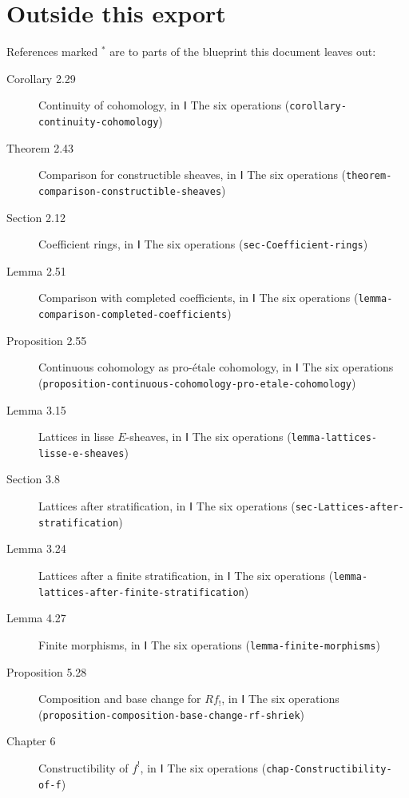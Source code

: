 \documentclass[11pt]{article}
\newcommand{\bpslug}[1]{\texttt{#1}}
\begin{document}
\section*{Outside this export}
References marked \ensuremath{{}^\ast} are to parts of the blueprint this document leaves out:
\begin{description}
\item[Corollary 2.29] Continuity of cohomology, in Ⅰ The six operations (\bpslug{corollary-{}\allowbreak{}continuity-{}\allowbreak{}cohomology})
\item[Theorem 2.43] Comparison for constructible sheaves, in Ⅰ The six operations (\bpslug{theorem-{}\allowbreak{}comparison-{}\allowbreak{}constructible-{}\allowbreak{}sheaves})
\item[Section 2.12] Coefficient rings, in Ⅰ The six operations (\bpslug{sec-{}\allowbreak{}Coefficient-{}\allowbreak{}rings})
\item[Lemma 2.51] Comparison with completed coefficients, in Ⅰ The six operations (\bpslug{lemma-{}\allowbreak{}comparison-{}\allowbreak{}completed-{}\allowbreak{}coefficients})
\item[Proposition 2.55] Continuous cohomology as pro-étale cohomology, in Ⅰ The six operations (\bpslug{proposition-{}\allowbreak{}continuous-{}\allowbreak{}cohomology-{}\allowbreak{}pro-{}\allowbreak{}etale-{}\allowbreak{}cohomology})
\item[Lemma 3.15] Lattices in lisse $E$-sheaves, in Ⅰ The six operations (\bpslug{lemma-{}\allowbreak{}lattices-{}\allowbreak{}lisse-{}\allowbreak{}e-{}\allowbreak{}sheaves})
\item[Section 3.8] Lattices after stratification, in Ⅰ The six operations (\bpslug{sec-{}\allowbreak{}Lattices-{}\allowbreak{}after-{}\allowbreak{}stratification})
\item[Lemma 3.24] Lattices after a finite stratification, in Ⅰ The six operations (\bpslug{lemma-{}\allowbreak{}lattices-{}\allowbreak{}after-{}\allowbreak{}finite-{}\allowbreak{}stratification})
\item[Lemma 4.27] Finite morphisms, in Ⅰ The six operations (\bpslug{lemma-{}\allowbreak{}finite-{}\allowbreak{}morphisms})
\item[Proposition 5.28] Composition and base change for $Rf_!$, in Ⅰ The six operations (\bpslug{proposition-{}\allowbreak{}composition-{}\allowbreak{}base-{}\allowbreak{}change-{}\allowbreak{}rf-{}\allowbreak{}shriek})
\item[Chapter 6] Constructibility of $f^!$, in Ⅰ The six operations (\bpslug{chap-{}\allowbreak{}Constructibility-{}\allowbreak{}of-{}\allowbreak{}f})

\end{description}
\end{document}
